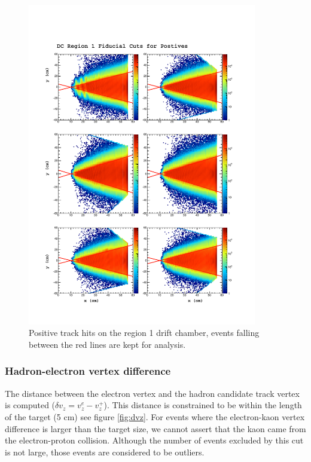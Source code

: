 \begin{figure}
  \label{fig:fid}
  \begin{center}
    \includegraphics[width=10cm]{image/plots/hadron-id/fid.pdf}
    \caption{Positive track hits on the region 1 drift chamber, events falling between the red lines are kept for analysis.}
  \end{center}
\end{figure}

\subsubsection*{Hadron-electron vertex difference}
The distance between the electron vertex and the hadron candidate track vertex is computed ($\delta v_{z} = v_{z}^{e} - v_{z}^{+}$).  This distance is constrained to be within the length of the target (5 cm) see figure \ref{fig:dvz}.  For events where the electron-kaon vertex difference is larger than the target size, we cannot assert that the kaon came from the electron-proton collision.  Although the number of events excluded by this cut is not large, those events are considered to be outliers.  

